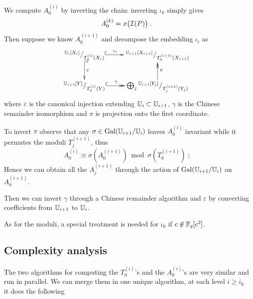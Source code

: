 We compute $A_0^{(i)}$ by inverting the chain: inverting $\iota_k$
simply gives
\begin{equation}
  \label{eq:A_0^k}
  A_0^{(k)} = x\bigl(\mathcal{I}(P)\bigr)
  \;\text{.}
\end{equation}
Then suppose we know $A_0^{(i+1)}$ and decompose the embedding
$\iota_i$ as
\begin{equation}
  \xymatrix{
    ^{\U_i[X_i]}/_{T_0^{(i)}(X_i)} \ar@{^{(}->}[r]^-{\iota_i} \ar@{^{(}->}[d]^{\varepsilon} &
    ^{\U_{i+1}[X_{i+1}]}/_{T_0^{(i+1)}(X_{i+1})} \\
    ^{\U_{i+1}[Y]}/_{T_0^{(i)}(Y)} \ar@{^{(}->>}[r]^-{\gamma} &
    \bigoplus_j {}^{\U_{i+1}[Y_{j}]}/_{T_j^{(i+1)}(Y_{j})} \ar@{->>}[u]_{\pi}
  }
\end{equation}
where $\varepsilon$ is the canonical injection extending
$\mathbb{U}_i\subset\mathbb{U}_{i+1}$, $\gamma$ is the Chinese remainder isomorphism
and $\pi$ is projection onto the first coordinate.

To invert $\pi$ observe that any $\sigma\in\operatorname{Gal}(\mathbb{U}_{i+1}/\mathbb{U}_i)$ leaves
$A_0^{(i)}$ invariant while it permutes the moduli $T_j^{(i+1)}$, thus
\begin{equation}
  A_0^{(i)} \equiv \sigma\left(A_0^{(i+1)}\right)
  \bmod \sigma\left(T_0^{(i+1)}\right)
  \;\text{;}
\end{equation}
Hence we can obtain all the $A_j^{(i+1)}$ through the action of
$\operatorname{Gal}(\mathbb{U}_{i+1}/\mathbb{U}_i)$ on $A_0^{(i+1)}$.

Then we can invert $\gamma$ through a Chinese remainder algorithm
\cite[$\S$10.3]{vzGG} and $\varepsilon$ by converting coefficients from
$\mathbb{U}_{i+1}$ to $\mathbb{U}_i$.

As for the moduli, a special treatment is needed for $\iota_0$ if
$c\not\in\mathbb{F}_q[c^2]$.


\subsection{Complexity analysis}
\label{sec:C2-AS-FI:complexity}

The two algorithms for computing the $T_{0}^{(i)}$'s and the
$A_{0}^{(i)}$'s are very similar and run in parallel. We can merge
them in one unique algorithm, at each level $i\ge i_0$ it does the
following

